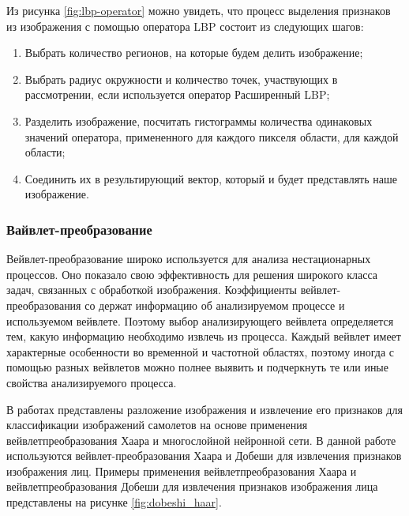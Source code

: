 Из рисунка \ref{fig:lbp-operator} можно увидеть, что процесс выделения признаков
из изображения с помощью оператора LBP состоит из следующих шагов:
\begin{enumerate}
\item Выбрать количество регионов, на которые будем делить изображение;
\item Выбрать радиус окружности и количество точек, участвующих в рассмотрении,
если используется оператор Расширенный LBP;
\item Разделить изображение, посчитать гистограммы количества одинаковых
значений оператора, примененного для каждого пикселя области, для каждой
области;
\item Соединить их в результирующий вектор, который и будет представлять наше
изображение.
\end{enumerate}


\subsubsection{Вайвлет-преобразование}

Вейвлет-преобразование широко используется
для анализа нестационарных процессов. Оно показало свою эффективность для решения широкого
класса задач, связанных с обработкой изображения. Коэффициенты вейвлет-преобразования со
держат информацию об анализируемом процессе
и используемом вейвлете. Поэтому выбор анализирующего вейвлета определяется тем, какую информацию необходимо извлечь из процесса. Каждый
вейвлет имеет характерные особенности во временной и частотной областях, поэтому иногда
с помощью разных вейвлетов можно полнее выявить и подчеркнуть те или иные свойства анализируемого процесса.

В работах \cite{vaivlet_1,vaivlet_2} представлены разложение изображения и извлечение его признаков для классификации изображений
самолетов на основе применения вейвлетпреобразования Хаара и многослойной нейронной сети. В данной работе используются вейвлет-преобразования Хаара и Добеши
для извлечения признаков изображения лиц. Примеры применения вейвлетпреобразования Хаара
и вейвлетпреобразования Добеши для извлечения
признаков изображения лица представлены на
рисунке \ref{fig:dobeshi_haar}.

